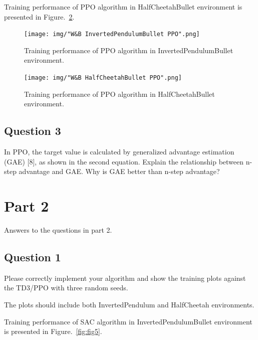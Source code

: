 \documentclass[12pt]{article}
\begin{document}
Training performance of PPO algorithm in HalfCheetahBullet environment is presented in Figure.~\ref*{fig:fig4}.
\newline


\pagebreak

\begin{figure}[pht] 
	\centering  %
    \texttt{[image: img/"W\&B InvertedPendulumBullet PPO".png]}
	\caption{Training performance of PPO algorithm in InvertedPendulumBullet environment.}
	\label{fig:fig3}
\end{figure}

\begin{figure}[phb] 
	\centering  %
    \texttt{[image: img/"W\&B HalfCheetahBullet PPO".png]}
	\caption{Training performance of PPO algorithm in HalfCheetahBullet environment.}
	\label{fig:fig4}
\end{figure}

\pagebreak

\subsection*{Question 3}

In PPO, the target value is calculated by generalized advantage estimation (GAE) [8], 
as shown in the second equation. Explain the relationship between n-step advantage and GAE. 
Why is GAE better than n-step advantage?

\pagebreak



\section*{Part 2}

Answers to the questions in part 2.
\newline

\subsection*{Question 1}

\noindent
Please correctly implement your algorithm and show the training plots against the TD3/PPO
with three random seeds. 
\newline

\noindent
The plots should include both InvertedPendulum and HalfCheetah environments. 
\newline


Training performance of SAC algorithm in InvertedPendulumBullet environment is presented in Figure.~\ref*{fig:fig5}.
\newline
\end{document}

